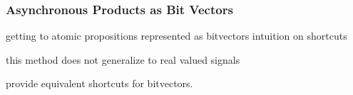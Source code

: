 \subsubsection{Asynchronous Products as Bit Vectors}
getting to atomic propositions represented as bitvectors
intuition on shortcuts

\begin{remark}
	this method does not generalize to real valued signals
\end{remark}

provide equivalent shortcuts for bitvectors.




